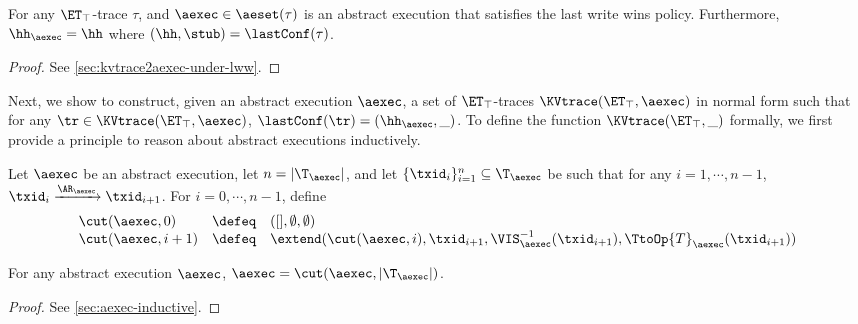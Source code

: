 \begin{proposition}
\label{prop:kvtrace2aexec}
For any $\ET_{\top}$-trace $\tau$, and $\aexec \in \aeset(\tau)$ is an abstract execution that 
satisfies the last write wins policy.
Furthermore, $\hh_{\aexec} = \hh$ where $(\hh, \stub) = \lastConf(\tau)$.
\end{proposition}
\begin{proof}
    See \cref{sec:kvtrace2aexec-under-lww}.
\end{proof}

Next, we show to construct, given an abstract execution $\aexec$, 
a set of $\ET_{\top}$-traces $\KVtrace(\ET_{\top}, \aexec)$ in normal form such that for any 
$\tr \in \KVtrace(\ET_{\top}, \aexec)$, $\lastConf(\tr) = (\hh_{\aexec}, \_)$. 
To define the function $\KVtrace(\ET_{\top}, \_)$ formally, we first provide a principle 
to reason about abstract executions inductively. 
\begin{definition}
\label{def:aexec.inductive}
Let $\aexec$ be an abstract execution, let $n = \lvert \T_{\aexec} \rvert$, and let 
$\{\txid_{i}\}_{i=1}^{n} \subseteq \T_{\aexec}$ be such that for any $i=1,\cdots,n-1$, 
$\txid_{i} \xrightarrow{\AR_{\aexec}} \txid_{i+1}$. 
For $i = 0,\cdots, n-1$, define 
\[
\begin{array}{lll}
\cut(\aexec, 0) & \defeq & ([], \emptyset, \emptyset)\\
\cut(\aexec , i+1) & \defeq & \extend(\cut(\aexec, i), \txid_{i+1}, \VIS^{-1}_{\aexec}(\txid_{i+1}), \TtoOp{T}_{\aexec}(\txid_{i+1}))
\end{array}
\]
\end{definition}

\begin{proposition}
\label{prop:aexec.inductive}
For any abstract execution $\aexec$, $\aexec = \cut(\aexec, \lvert \T_{\aexec} \rvert)$.
\end{proposition}
\begin{proof}
    See \cref{sec:aexec-inductive}.
\end{proof}


